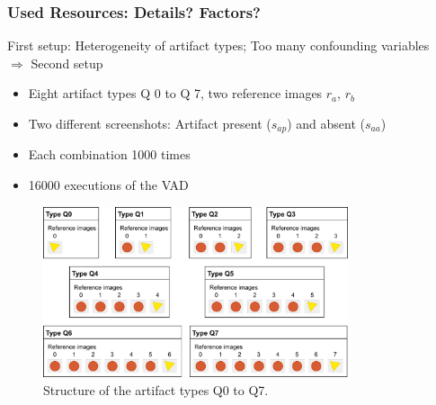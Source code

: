 \documentclass[xcolor=dvipsnames]{beamer}
\begin{document}
	\begin{frame}
		\frametitle{Used Resources: Details? Factors?}
		First setup: Heterogeneity of artifact types; Too many confounding variables\\
		$\Rightarrow$ Second setup
		\pause
		\begin{itemize}
			\item Eight artifact types Q 0 to Q 7, two reference images $r_a$, $r_b$
			\item Two different screenshots: Artifact present ($s_{ap}$) and absent ($s_{aa}$)
			\item Each combination 1000 times
			\item 16000 executions of the VAD
		\end{itemize}
	\end{frame}
	
	\begin{frame}
		\begin{figure}[h!]
			\centering
			\includegraphics[width=0.8\textwidth]{fig/artifact_types_t2}
			\caption{Structure of the artifact types Q0 to Q7.}
		\end{figure}
	\end{frame}
	
\end{document}
